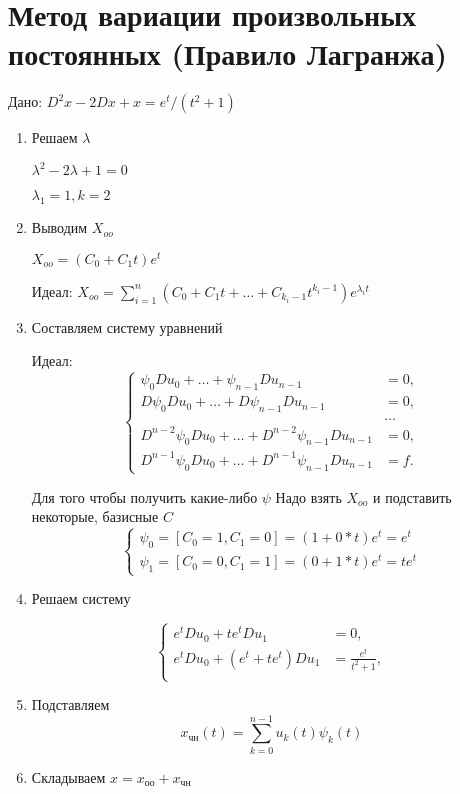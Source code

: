 \documentclass[a4paper, 12pt]{article}
\begin{document}
\section{Метод вариации произвольных постоянных (Правило Лагранжа)}
Дано: $D^2x-2Dx+x=e^t/(t^2+1)$
\begin{enumerate}
    \item Решаем $\lambda$

    $\lambda^2-2\lambda+1=0$
    
    $\lambda_1=1,k=2$
    \item Выводим $X_{oo}$
    
    $X_{oo}=(C_0+C_{1}t)e^{t}$

    Идеал: $X_{oo}=\sum_{i=1}^{n}(C_0+C_1t+\dots+C_{k_{i}-1}t^{k_i-1})e^{\lambda_i t}$

    \item Составляем систему уравнений
    
    Идеал: 
    \[
\left\{
\begin{aligned}
    \psi_0 D u_0 + \dots + \psi_{n-1} D u_{n-1} &= 0, \\
    D \psi_0 D u_0 + \dots + D \psi_{n-1} D u_{n-1} &= 0, \\
    & \dots \\
    D^{n-2} \psi_0 D u_0 + \dots + D^{n-2} \psi_{n-1} D u_{n-1} &= 0, \\
    D^{n-1} \psi_0 D u_0 + \dots + D^{n-1} \psi_{n-1} D u_{n-1} &= f.
\end{aligned}
\right.
\]

Для того чтобы получить какие-либо $\psi$ Надо взять $X_{oo}$ и подставить некоторые, базисные $C$
\[
\left\{
\begin{aligned}
    \psi_0 = [C_0 = 1, C_1 = 0] = (1+0*t)e^{t} =  e^{t} \\
    \psi_1 = [C_0 = 0, C_1 = 1] = (0+1*t)e^{t} = te^{t}
\end{aligned}
\right.
\]
    \item Решаем систему
    
\[
\left\{
\begin{aligned}
    e^{t} D u_0 + te^{t} D u_{1} &= 0, \\
    e^{t} D u_0 + (e^{t}+te^{t}) D u_{1} &= \frac{e^{t}}{t^2+1}, \\
\end{aligned}
\right.
\]    

    \item Подставляем
    $$x_{\text{чн}}(t) = \sum_{k=0}^{n-1} u_k(t) \psi_k(t)$$
    \item Складываем
    $x=x_{\text{оо}}+x_{\text{чн}}$
\end{enumerate}
\end{document}
